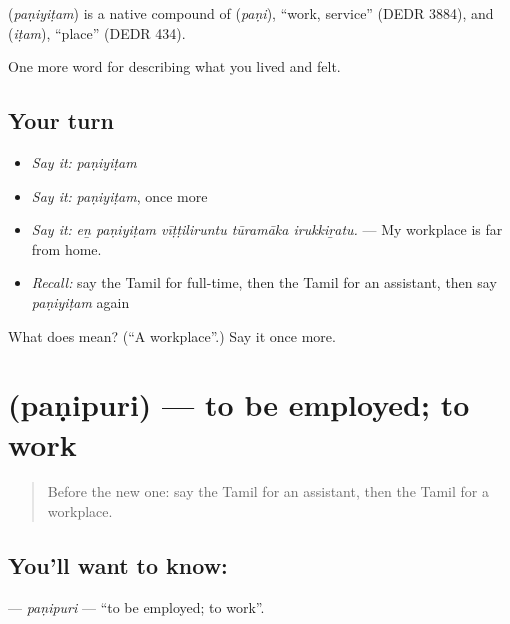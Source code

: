 \begin{cousinweb}
\textbf{} (\emph{paṇiyiṭam}) is a native compound of  (\emph{paṇi}), \textquotedblleft{}work, service\textquotedblright{} (DEDR 3884), and  (\emph{iṭam}), \textquotedblleft{}place\textquotedblright{} (DEDR 434).
\end{cousinweb}

\begin{grammarlens}[title={What you've built}]
One more word for describing what you lived and felt.
\end{grammarlens}

\subsection*{Your turn}
\begin{itemize}
\raggedright
  \item \emph{Say it:} \emph{paṇiyiṭam}
  \item \emph{Say it:} \emph{paṇiyiṭam}, once more
  \item \emph{Say it:} \emph{eṉ paṇiyiṭam vīṭṭiliruntu tūramāka irukkiṟatu.} — My workplace is far from home.
  \item \emph{Recall:} say the Tamil for full-time, then the Tamil for an assistant, then say \emph{paṇiyiṭam} again
\end{itemize}

\begin{tcolorbox}[breakable,colback=teal!4,colframe=teal!35!black,title={Before you move on}]
What does  mean? (\textquotedblleft{}A workplace\textquotedblright{}.) Say it once more.
\end{tcolorbox}
\section[\texorpdfstring{\ta{பணிபுரி} (paṇipuri)}{பணிபுரி (paṇipuri)}]{ (paṇipuri) — to be employed; to work}

\label{lesson:TA-C507-panipuri}



\begin{quote}
Before the new one: say the Tamil for an assistant, then the Tamil for a workplace.
\end{quote}

\subsection*{You'll want to know: }
\textbf{} — \emph{paṇipuri} — \textquotedblleft{}to be employed; to work\textquotedblright{}.

